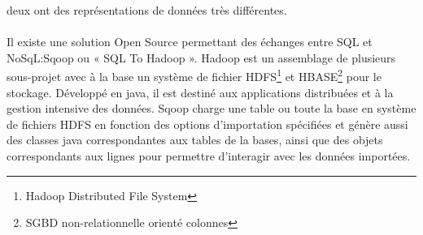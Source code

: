 deux ont des représentations de données très différentes.
\\
\\
Il existe une solution \textsf{Open Source} permettant des échanges entre \textsf{SQL} et \textsf{NoSqL}:\textsf{Sqoop} ou « SQL To Hadoop ». \textsf{Hadoop} est un assemblage de plusieurs sous-projet avec à 
la base  un système de fichier \textsf{HDFS}\footnote{Hadoop Distributed File System} et \textsf{HBASE}\footnote{\textsf{SGBD} non-relationnelle orienté colonnes} pour le stockage. Développé en \textsf{java}, il est destiné aux applications distribuées et à la gestion intensive des données. \textsf{Sqoop} charge une table ou toute la base en système de fichiers \textsf{HDFS} en fonction des options d'importation spécifiées et génère aussi des classes \textsf{java} correspondantes aux tables de la bases, ainsi que des objets correspondants aux lignes pour permettre d'interagir avec les données importées.
